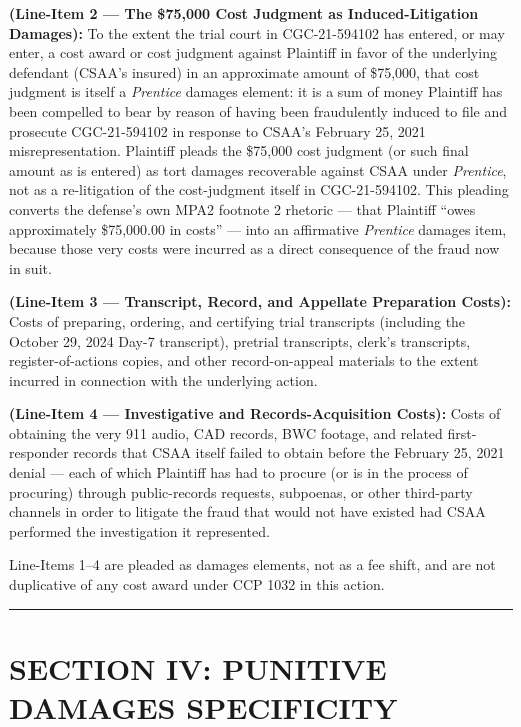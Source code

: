 \textbf{(Line-Item 2 --- The \$75,000 Cost Judgment as Induced-Litigation Damages):} To the extent the trial court in CGC-21-594102 has entered, or may enter, a cost award or cost judgment against Plaintiff in favor of the underlying defendant (CSAA's insured) in an approximate amount of \$75,000, that cost judgment is itself a \emph{Prentice} damages element: it is a sum of money Plaintiff has been compelled to bear by reason of having been fraudulently induced to file and prosecute CGC-21-594102 in response to CSAA's February 25, 2021 misrepresentation. Plaintiff pleads the \$75,000 cost judgment (or such final amount as is entered) as tort damages recoverable against CSAA under \emph{Prentice}, not as a re-litigation of the cost-judgment itself in CGC-21-594102. This pleading converts the defense's own MPA2 footnote 2 rhetoric --- that Plaintiff ``owes approximately \$75,000.00 in costs'' --- into an affirmative \emph{Prentice} damages item, because those very costs were incurred as a direct consequence of the fraud now in suit.

\textbf{(Line-Item 3 --- Transcript, Record, and Appellate Preparation Costs):} Costs of preparing, ordering, and certifying trial transcripts (including the October 29, 2024 Day-7 transcript), pretrial transcripts, clerk's transcripts, register-of-actions copies, and other record-on-appeal materials to the extent incurred in connection with the underlying action.

\textbf{(Line-Item 4 --- Investigative and Records-Acquisition Costs):} Costs of obtaining the very 911 audio, CAD records, BWC footage, and related first-responder records that CSAA itself failed to obtain before the February 25, 2021 denial --- each of which Plaintiff has had to procure (or is in the process of procuring) through public-records requests, subpoenas, or other third-party channels in order to litigate the fraud that would not have existed had CSAA performed the investigation it represented.

Line-Items 1--4 are pleaded as damages elements, not as a fee shift, and are not duplicative of any cost award under CCP \textsection{} 1032 in this action.

\begin{center}\rule{0.5\linewidth}{0.5pt}\end{center}

\label{toc:section-iv-punitive-damages-specificity}
\section{SECTION IV: PUNITIVE DAMAGES SPECIFICITY}\label{section-iv-punitive-damages-specificity}

